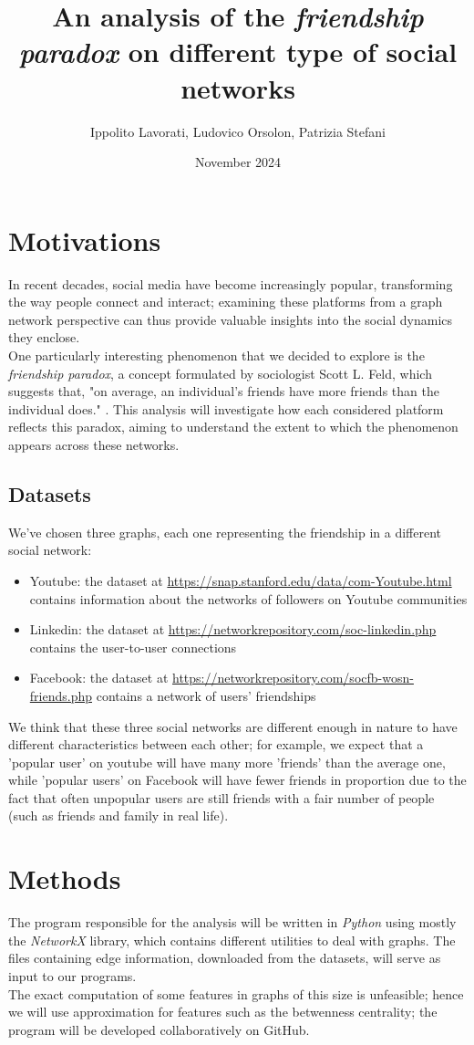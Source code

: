 \documentclass{article}
\title{An analysis of the \textit{friendship paradox} on different type of social networks}
\author{Ippolito Lavorati, Ludovico Orsolon, Patrizia Stefani}
\date{November 2024}
\begin{document}
\maketitle
\section{Motivations}
In recent decades, social media have become increasingly popular, transforming the way people connect and interact; examining these platforms from a graph network perspective can thus provide valuable insights into the social dynamics they enclose.\\
One particularly interesting phenomenon that we decided to explore is the \textit{friendship paradox}, a concept formulated by sociologist Scott L. Feld, which suggests that, "on average, an individual's friends have more friends than the individual does." \cite{friendship_paradox}.
This analysis will investigate how each considered platform reflects this paradox, aiming to understand the extent to which the phenomenon appears across these networks.

\subsection{Datasets}
We’ve chosen three graphs, each one representing the friendship in a different social network:
\begin{itemize}
    \item Youtube: the dataset at \url{https://snap.stanford.edu/data/com-Youtube.html} contains information about the networks of followers on Youtube communities 
    \item Linkedin: the dataset at \url{https://networkrepository.com/soc-linkedin.php} contains the user-to-user connections
    \item Facebook: the dataset at \url{https://networkrepository.com/socfb-wosn-friends.php} contains a network of users' friendships
\end{itemize}
We think that these three social networks are different enough in nature to have different characteristics between each other; for example, we expect that a 'popular user' on youtube will have many more 'friends' than the average one, while 'popular users' on Facebook will have fewer friends in proportion due to the fact that often unpopular users are still friends with a fair number of people (such as friends and family in real life).

\section{Methods}
The program responsible for the analysis will be written in \textit{Python} using mostly the \textit{NetworkX} library, which contains different utilities to deal with graphs. The files containing edge information, downloaded from the datasets, will serve as input to our programs. \\
The exact computation of some features in graphs of this size is unfeasible; hence we will use approximation for features such as the betwenness centrality; the program will be developed collaboratively on GitHub.
\end{document}
